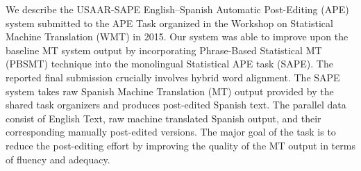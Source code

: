 We describe the USAAR-SAPE English--Spanish Automatic Post-Editing (APE) system submitted to the APE Task organized in the Workshop on Statistical Machine Translation (WMT) in 2015. Our system was able to improve upon the baseline MT system output by incorporating Phrase-Based Statistical MT (PBSMT) technique into the monolingual Statistical APE task (SAPE). The reported final submission crucially involves hybrid word alignment. The SAPE system takes raw Spanish Machine Translation (MT) output provided by the shared task organizers and produces post-edited Spanish text. The parallel data consist of English Text, raw machine translated Spanish output, and their corresponding manually post-edited versions. The major goal of the task is to reduce the post-editing effort by improving the quality of the MT output in terms of fluency and adequacy.
